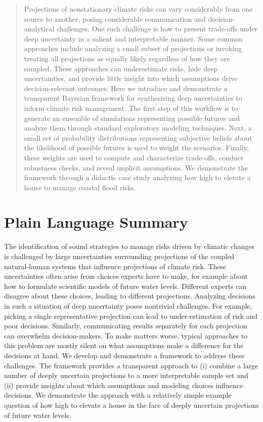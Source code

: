 \documentclass{agujournal2019}
\begin{document}
\begin{abstract}
  Projections of nonstationary climate risks can vary considerably from one source to another, posing considerable communication and decision-analytical challenges.
  One such challenge is how to present trade-offs under deep uncertainty in a salient and interpretable manner.
  Some common approaches include analyzing a small subset of projections or invoking treating all projections as equally likely regardless of how they are sampled.
  These approaches can underestimate risks, hide deep uncertainties, and provide little insight into which assumptions drive decision-relevant outcomes.
  Here we introduce and demonstrate a transparent Bayesian framework for synthesizing deep uncertainties to inform climate risk management.
  The first step of this workflow is to generate an ensemble of simulations representing possible futures and analyze them through standard exploratory modeling techniques.
  Next, a small set of probability distributions representing subjective beliefs about the likelihood of possible futures is used to weight the scenarios.
  Finally, these weights are used to compute and characterize trade-offs, conduct robustness checks, and reveal implicit assumptions.
  We demonstrate the framework through a didactic case study analyzing how high to elevate a house to manage coastal flood risks.
\end{abstract}

\section*{Plain Language Summary}

The identification of sound strategies to manage risks driven by climatic changes is challenged by large uncertainties surrounding projections of the coupled natural-human systems that influence projections of climate risk.
These uncertainties often arise from choices experts have to make, for example about how to formulate scientific models of future water levels.
Different experts can disagree about these choices, leading to different projections.
Analyzing decisions in such a situation of deep uncertainty poses nontrivial challenges.
For example, picking a single representative projection can lead to under-estimation of risk and poor decisions.
Similarly, communicating results separately for each projection can overwhelm decision-makers.
To make matters worse, typical approaches to this problem are mostly silent on what assumptions make a difference for the decisions at hand.
We develop and demonstrate a framework to address these challenges.
The framework provides a transparent approach to (i) combine a large number of deeply uncertain projections to a more interpretable sample set and (ii) provide insights about which assumptions and modeling choices influence decisions.
We demonstrate the approach with a relatively simple example question of how high to elevate a house in the face of deeply uncertain projections of future water levels.
\end{document}
